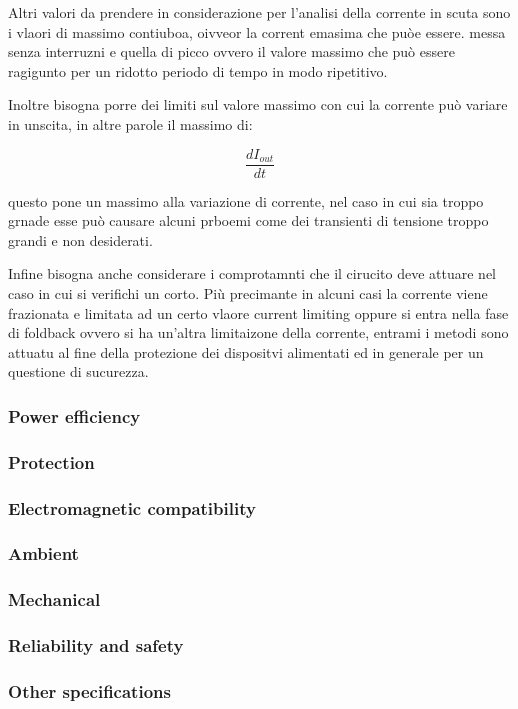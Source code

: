 \documentclass[../main.tex]{subfiles}
\begin{document}
Altri valori da prendere in considerazione per l'analisi della corrente in scuta sono i vlaori di massimo contiuboa, oivveor la corrent emasima che puòe essere. messa senza interruzni e quella di picco ovvero il valore massimo che può essere ragigunto per un ridotto periodo di tempo in modo ripetitivo.

Inoltre bisogna porre dei limiti sul valore massimo con cui la corrente può variare in unscita, in altre parole il massimo di:

\begin{equation}
	\frac{\unit{d}I_{out}}{\unit{d}t}
\end{equation}

questo pone un massimo alla variazione di corrente, nel caso in cui sia troppo grnade esse può causare alcuni prboemi come dei transienti di tensione troppo grandi e non desiderati.

Infine bisogna anche considerare i comprotamnti che il cirucito deve attuare nel caso in cui si verifichi un corto.
Più precimante in alcuni casi la corrente viene frazionata e limitata ad un certo vlaore current limiting oppure si entra nella fase di foldback ovvero si ha un'altra limitaizone della corrente, entrami i metodi sono attuatu al fine della protezione dei dispositvi alimentati ed in generale per un questione di sucurezza.

\subsubsection*{Power efficiency}


\subsubsection*{Protection}

\subsubsection*{Electromagnetic compatibility}

\subsubsection*{Ambient}

\subsubsection*{Mechanical}

\subsubsection*{Reliability and safety}


\subsubsection{Other specifications}
\end{document}
